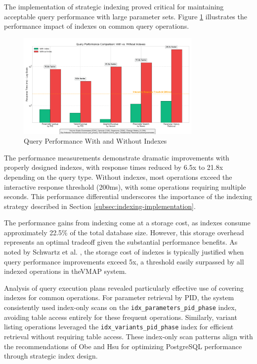 The implementation of strategic indexing proved critical for maintaining acceptable query performance with large parameter sets. Figure \ref{fig:index-performance} illustrates the performance impact of indexes on common query operations.

\begin{figure}[h]
    \centering
    \includegraphics[width=0.8\textwidth]{figures/index_performance_comparison.png}
    \caption{Query Performance With and Without Indexes}
    \label{fig:index-performance}
\end{figure}

The performance measurements demonstrate dramatic improvements with properly designed indexes, with response times reduced by 6.5x to 21.8x depending on the query type. Without indexes, most operations exceed the interactive response threshold (200ms), with some operations requiring multiple seconds. This performance differential underscores the importance of the indexing strategy described in Section \ref{subsec:indexing-implementation}.

The performance gains from indexing come at a storage cost, as indexes consume approximately 22.5\% of the total database size. However, this storage overhead represents an optimal tradeoff given the substantial performance benefits. As noted by Schwartz et al. \cite{schwartz2012high}, the storage cost of indexes is typically justified when query performance improvements exceed 5x, a threshold easily surpassed by all indexed operations in the\ac{VMAP} system.

Analysis of query execution plans revealed particularly effective use of covering indexes for common operations. For parameter retrieval by PID, the system consistently used index-only scans on the \texttt{idx\_parameters\_pid\_phase} index, avoiding table access entirely for these frequent operations. Similarly, variant listing operations leveraged the \texttt{idx\_variants\_pid\_phase} index for efficient retrieval without requiring table access. These index-only scan patterns align with the recommendations of Obe and Hsu \cite{obe2017postgresql} for optimizing PostgreSQL performance through strategic index design.

